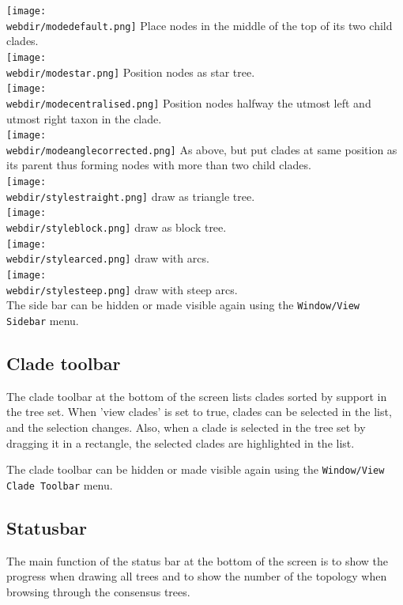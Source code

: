 \documentclass{article}
\def\webdir{/Users/remco/research/DensiTree/web}
\begin{document}
\texttt{[image: \\webdir/modedefault.png]} Place nodes in the middle of the top of its two child clades.\\
\texttt{[image: \\webdir/modestar.png]} Position nodes as star tree.\\
\texttt{[image: \\webdir/modecentralised.png]} Position nodes halfway the utmost left and utmost right taxon in the clade.\\
\texttt{[image: \\webdir/modeanglecorrected.png]} As above, but put clades at same position as its parent thus forming nodes with more than two child clades.\\

\texttt{[image: \\webdir/stylestraight.png]} draw as triangle tree.\\
\texttt{[image: \\webdir/styleblock.png]} draw as block tree.\\
\texttt{[image: \\webdir/stylearced.png]} draw with arcs.\\
\texttt{[image: \\webdir/stylesteep.png]} draw with steep arcs.\\

The side bar can be hidden or made visible again using the {\tt Window/View Sidebar} menu.



\subsection{Clade toolbar}

The clade toolbar at the bottom of the screen lists clades sorted by support in the tree set.
When 'view clades' is set to true, clades can be selected in the list, and the
selection changes. Also, when a clade is selected in the tree set by dragging it
in a rectangle, the selected clades are highlighted in the list.

The clade toolbar can be hidden or made visible again using the {\tt Window/View Clade Toolbar} menu.

\subsection{Statusbar}

The main function of the status bar at the bottom of the screen is to show the progress
when drawing all trees and to show the number of the topology when browsing through
the consensus trees.
\end{document}
